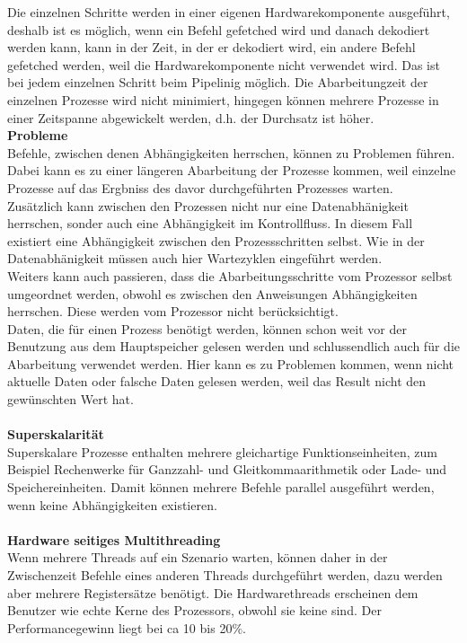 \documentclass[a4paper,12pt]{article}
\begin{document}
Die einzelnen Schritte werden in einer eigenen Hardwarekomponente ausgeführt, deshalb ist es möglich, wenn ein Befehl gefetched wird und danach dekodiert werden kann, kann in der Zeit, in der er dekodiert wird, ein andere Befehl gefetched werden, weil die Hardwarekomponente nicht verwendet wird. Das ist bei jedem einzelnen Schritt beim Pipelinig möglich. Die Abarbeitungzeit der einzelnen Prozesse wird nicht minimiert, hingegen können mehrere Prozesse in einer Zeitspanne abgewickelt werden, d.h. der Durchsatz ist höher.\\
\textbf{Probleme\\}
Befehle, zwischen denen Abhängigkeiten herrschen, können zu Problemen führen. Dabei kann es zu einer längeren Abarbeitung der Prozesse kommen, weil einzelne Prozesse auf das Ergbniss des davor durchgeführten Prozesses warten.\\ Zusätzlich kann zwischen den Prozessen nicht nur eine Datenabhänigkeit herrschen, sonder auch eine Abhängigkeit im Kontrollfluss. In diesem Fall existiert eine Abhängigkeit zwischen den Prozessschritten selbst. Wie in der Datenabhänigkeit müssen auch hier Wartezyklen eingeführt werden.\\
Weiters kann auch passieren, dass die Abarbeitungsschritte vom Prozessor selbst umgeordnet werden, obwohl es zwischen den Anweisungen Abhängigkeiten herrschen. Diese werden vom Prozessor nicht berücksichtigt.\\
Daten, die für einen Prozess benötigt werden, können schon weit vor der Benutzung aus dem Hauptspeicher gelesen werden und schlussendlich auch für die Abarbeitung verwendet werden. Hier kann es zu Problemen kommen, wenn nicht aktuelle Daten oder falsche Daten gelesen werden, weil das Result nicht den gewünschten Wert hat.\\\\
\textbf{Superskalarität\\}
Superskalare Prozesse enthalten mehrere gleichartige Funktionseinheiten, zum Beispiel Rechenwerke für Ganzzahl- und Gleitkommaarithmetik oder Lade- und Speichereinheiten. Damit können mehrere Befehle parallel ausgeführt werden, wenn keine Abhängigkeiten existieren.\\\\
\textbf{Hardware seitiges Multithreading\\}
Wenn mehrere Threads auf ein Szenario warten, können daher in der Zwischenzeit Befehle eines anderen Threads durchgeführt werden, dazu werden aber mehrere Registersätze benötigt.
Die Hardwarethreads erscheinen dem Benutzer wie echte Kerne des Prozessors, obwohl sie keine sind. Der Performancegewinn liegt bei ca 10 bis 20\%.\\\\
\end{document}
